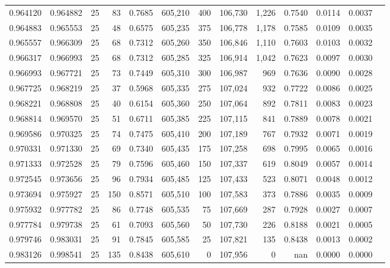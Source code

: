 \begin{tabular}{rrrrrrrrrrrrr}
0.964120 & 0.964882 &    25 &  83 &                                     0.7685 & 605,210 &     400 & 106,730 &   1,226 & 0.7540 & 0.0114 & 0.0037 \\
0.964883 & 0.965553 &    25 &  48 &                                     0.6575 & 605,235 &     375 & 106,778 &   1,178 & 0.7585 & 0.0109 & 0.0035 \\
0.965557 & 0.966309 &    25 &  68 &                                     0.7312 & 605,260 &     350 & 106,846 &   1,110 & 0.7603 & 0.0103 & 0.0032 \\
0.966317 & 0.966993 &    25 &  68 &                                     0.7312 & 605,285 &     325 & 106,914 &   1,042 & 0.7623 & 0.0097 & 0.0030 \\
0.966993 & 0.967721 &    25 &  73 &                                     0.7449 & 605,310 &     300 & 106,987 &     969 & 0.7636 & 0.0090 & 0.0028 \\
0.967725 & 0.968219 &    25 &  37 &                                     0.5968 & 605,335 &     275 & 107,024 &     932 & 0.7722 & 0.0086 & 0.0025 \\
0.968221 & 0.968808 &    25 &  40 &                                     0.6154 & 605,360 &     250 & 107,064 &     892 & 0.7811 & 0.0083 & 0.0023 \\
0.968814 & 0.969570 &    25 &  51 &                                     0.6711 & 605,385 &     225 & 107,115 &     841 & 0.7889 & 0.0078 & 0.0021 \\
0.969586 & 0.970325 &    25 &  74 &                                     0.7475 & 605,410 &     200 & 107,189 &     767 & 0.7932 & 0.0071 & 0.0019 \\
0.970331 & 0.971330 &    25 &  69 &                                     0.7340 & 605,435 &     175 & 107,258 &     698 & 0.7995 & 0.0065 & 0.0016 \\
0.971333 & 0.972528 &    25 &  79 &                                     0.7596 & 605,460 &     150 & 107,337 &     619 & 0.8049 & 0.0057 & 0.0014 \\
0.972545 & 0.973656 &    25 &  96 &                                     0.7934 & 605,485 &     125 & 107,433 &     523 & 0.8071 & 0.0048 & 0.0012 \\
0.973694 & 0.975927 &    25 & 150 &                                     0.8571 & 605,510 &     100 & 107,583 &     373 & 0.7886 & 0.0035 & 0.0009 \\
0.975932 & 0.977782 &    25 &  86 &                                     0.7748 & 605,535 &      75 & 107,669 &     287 & 0.7928 & 0.0027 & 0.0007 \\
0.977784 & 0.979738 &    25 &  61 &                                     0.7093 & 605,560 &      50 & 107,730 &     226 & 0.8188 & 0.0021 & 0.0005 \\
0.979746 & 0.983031 &    25 &  91 &                                     0.7845 & 605,585 &      25 & 107,821 &     135 & 0.8438 & 0.0013 & 0.0002 \\
0.983126 & 0.998541 &    25 & 135 &                                     0.8438 & 605,610 &       0 & 107,956 &       0 &    nan & 0.0000 & 0.0000 \\
\bottomrule
\end{tabular}
